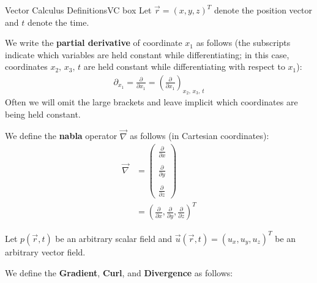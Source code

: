 \begin{fact}{Vector Calculus Definitions}{VC box}\label{VC box}
    Let $\vec{r}=(x,y,z)^T$ denote the position vector and $t$ denote the time.\vspace{3mm}

    \begin{minipage}{0.49\linewidth}
        We write the \textbf{partial derivative} of coordinate $x_1$ as follows (the subscripts indicate which variables are held constant while differentiating; in this case, coordinates $x_2, \, x_3,\, t$ are held constant while differentiating with respect to $x_1$):
        \begin{align}\label{partial}
            \partial_{x_1}=\frac{\partial}{\partial x_1}=\left( \frac{\partial}{\partial x_1} \right)_{x_2,\,x_3,\,t}
        \end{align}
        Often we will omit the large brackets and leave implicit which coordinates are being held constant.
    \end{minipage}
    \hfill
    \begin{minipage}{0.49\linewidth}
        We define the \textbf{nabla} operator $\vec{\nabla}$ as follows (in Cartesian coordinates):
        \begin{align}
            \vec{\nabla}&=\left( \begin{array}{c}
                \frac{\partial}{\partial x}\\\\
                \frac{\partial}{\partial y}\\\\
                \frac{\partial}{\partial z}
            \end{array} \right)
            \\
            &=\left( \frac{\partial}{\partial x}, \frac{\partial}{\partial y}, \frac{\partial}{\partial z} \right)^T \nonumber
        \end{align}
    \end{minipage}

    \vspace{3mm}Let $p(\vec{r},t)$ be an arbitrary scalar field and $\vec{u}(\vec{r},t)=(u_x,u_y,u_z)^T$ be an arbitrary vector field.

    We define the \textbf{Gradient}, \textbf{Curl}, and \textbf{Divergence} as follows:


\end{fact}
